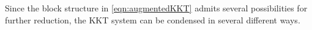 \documentclass{article}
\begin{document}
Since the block structure in \cref{eqn:augmentedKKT} admits several possibilities for further reduction, the KKT system can be condensed in several different ways.

\end{document}
